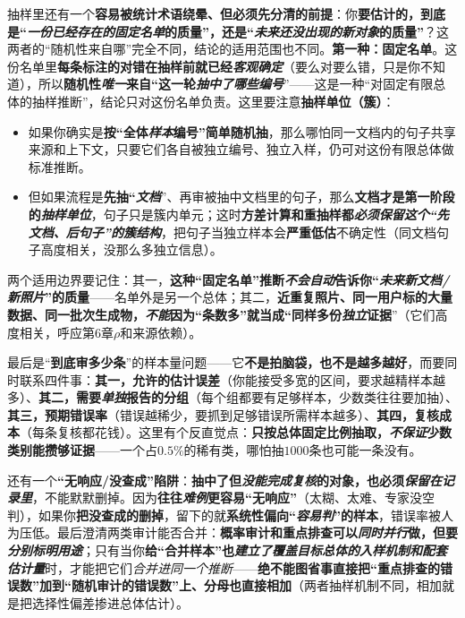 抽样里还有一个\textbf{容易被统计术语绕晕、但必须先分清的前提}：你\textbf{要估计的，到底是“\emph{一份\emph{已经存在}的固定名单}的质量”，还是“\emph{未来\emph{还没出现}的新对象}的质量”}？这两者的“随机性来自哪”完全不同，结论的适用范围也不同。\textbf{第一种：固定名单}。这份名单里\textbf{每条标注的对错在抽样前就已经\emph{客观确定}}（要么对要么错，只是你不知道），所以\textbf{随机性\emph{唯一}来自“这一轮\emph{抽中了哪些编号}}”——这是一种“对固定有限总体的抽样推断”，结论只对这份名单负责。这里要注意\textbf{抽样单位（簇）}：
\begin{itemize}\item 如果你确实是\textbf{按“全体\emph{样本}编号”简单随机抽}，那么哪怕同一文档内的句子共享来源和上下文，只要它们各自被独立编号、独立入样，仍可对这份有限总体做标准推断。\item 但如果流程是\textbf{先抽“\emph{文档}}”、再审被抽中文档里的句子，那么\textbf{文档才是第一阶段的\emph{抽样单位}}，句子只是簇内单元；这时\textbf{方差计算和重抽样都\emph{必须保留这个“先文档、后句子”的簇结构}}，把句子当独立样本会\textbf{严重低估}不确定性（同文档句子高度相关，没那么多独立信息）。\end{itemize}
两个适用边界要记住：其一，\textbf{这种“固定名单”推断\emph{不会自动}告诉你“\emph{未来新文档/新照片}”的质量}——名单外是另一个总体；其二，\textbf{近重复照片、同一用户标的大量数据、同一批次生成物，\emph{不能}因为“条数多”就当成“同样多份\emph{独立}证据}”（它们高度相关，呼应第6章$\rho$和来源依赖）。

最后是“\textbf{到底审多少条}”的样本量问题——它\textbf{不是拍脑袋，也不是越多越好}，而要同时联系四件事：\textbf{其一，允许的估计误差}（你能接受多宽的区间，要求越精样本越多）、\textbf{其二，需要\emph{单独}报告的分组}（每个组都要有足够样本，少数类往往要加抽）、\textbf{其三，预期错误率}（错误越稀少，要抓到足够错误所需样本越多）、\textbf{其四，复核成本}（每条复核都花钱）。这里有个反直觉点：\textbf{只按总体固定比例抽取，\emph{不保证}少数类别能攒够证据}——一个占$0.5\%$的稀有类，哪怕抽$1000$条也可能一条没有。

还有一个\textbf{“无响应/没查成”陷阱}：\textbf{抽中了但\emph{没能完成复核}的对象，也必须\emph{保留在记录里}}，不能默默删掉。因为\textbf{往往\emph{难例}更容易“无响应”}（太糊、太难、专家没空判），如果你\textbf{把没查成的删掉}，留下的就\textbf{系统性偏向“\emph{容易判}”的样本}，错误率被人为压低。最后澄清两类审计能否合并：\textbf{概率审计和重点排查可以\emph{同时并行}做，但要\emph{分别标明用途}}；只有当你\textbf{给“合并样本”也\emph{建立了覆盖目标总体的入样机制和配套估计量}}时，才能把它们\emph{合并进同一个推断}——\textbf{绝不能图省事直接把“重点排查的错误数”加到“随机审计的错误数”上、分母也直接相加}（两者抽样机制不同，相加就是把选择性偏差掺进总体估计）。

